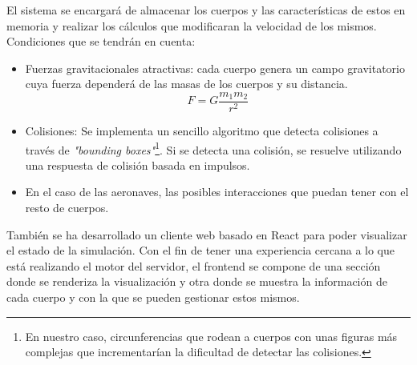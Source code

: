 El sistema se encargará de almacenar los cuerpos y las características de estos en memoria y realizar los cálculos que modificaran la velocidad de los mismos. Condiciones que se tendrán en cuenta: 
\begin{itemize}
    \item Fuerzas gravitacionales atractivas: cada cuerpo genera un campo gravitatorio cuya fuerza dependerá de las masas de los cuerpos y su distancia. 
        \begin{displaymath} 
            F=G\frac{{m_1}{m_2}}{{r^2}} 
        \end{displaymath} 
    
    \item Colisiones: Se implementa un sencillo algoritmo que detecta colisiones a través de \textit{"bounding boxes"}\footnote{En nuestro caso, circunferencias que rodean a cuerpos con unas figuras más complejas que incrementarían la dificultad de detectar las colisiones.}. Si se detecta una colisión, se resuelve utilizando una respuesta de colisión basada en impulsos. 
    \item En el caso de las aeronaves, las posibles interacciones que puedan tener con el resto de cuerpos.
\end{itemize}

También se ha desarrollado un cliente web basado en React para poder visualizar el estado de la simulación. Con el fin de tener una experiencia cercana a lo que está realizando el motor del servidor, el frontend se compone de una sección donde se renderiza la visualización y otra donde se muestra la información de cada cuerpo y con la que se pueden gestionar estos mismos.


